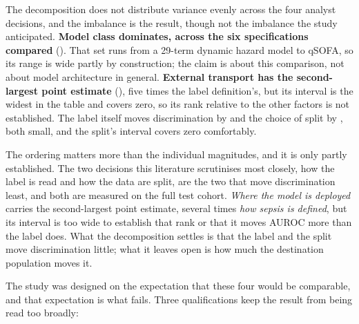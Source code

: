 The decomposition does not distribute variance evenly across the four analyst
decisions, and the imbalance is the result, though not the imbalance the
study anticipated. \textbf{Model class dominates, across the six
specifications compared} (\pcSpreadModelClass). That set runs from a 29-term
dynamic hazard model to qSOFA, so its range is wide partly by construction; the
claim is about this comparison, not about model architecture in general.
\textbf{External transport has the second-largest point estimate}
(\pcSpreadMetric), five times the label definition's, but its interval is the
widest in the table and covers zero, so its rank relative to the other factors
is not established. The label itself moves discrimination by
\pcSpreadLabel{} and the choice of split by \pcSpreadSplit{}, both small,
and the split's interval covers zero comfortably.

The ordering matters more than the individual magnitudes, and it is only
partly established. The two decisions this literature scrutinises most closely,
how the label is read and how the data are split, are the two that move
discrimination least, and both are measured on the full test cohort.
\emph{Where the model is deployed} carries the second-largest point estimate,
several times \emph{how sepsis is defined}, but its interval is too wide to
establish that rank or that it moves AUROC more than the label does. What the
decomposition settles is that the label and the split move discrimination
little; what it leaves open is how much the destination population moves it.

The study was designed on the expectation that these four would be comparable,
and that expectation is what fails. Three qualifications keep the result from
being read too broadly:

